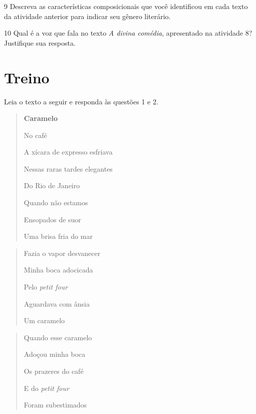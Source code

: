 \num{9} Descreva as características composicionais que você identificou
em cada texto da atividade anterior para indicar seu gênero literário.


\num{10} Qual é a voz que fala no texto \emph{A divina comédia},
apresentado na atividade 8? Justifique sua resposta.


\section{Treino}

Leia o texto a seguir e responda às questões 1 e 2.

\begin{quote}
\textbf{Caramelo}


No café

A xícara de expresso esfriava

Nessas raras tardes elegantes

Do Rio de Janeiro

Quando não estamos

Ensopados de suor

Uma brisa fria do mar
\end{quote}

\begin{quote}
Fazia o vapor desvanecer

Minha boca adocicada

Pelo \emph{petit four}

Aguardava com ânsia

Um caramelo
\end{quote}

\begin{quote}
Quando esse caramelo

Adoçou minha boca

Os prazeres do café

E do \emph{petit four}

Foram subestimados
\end{quote}

